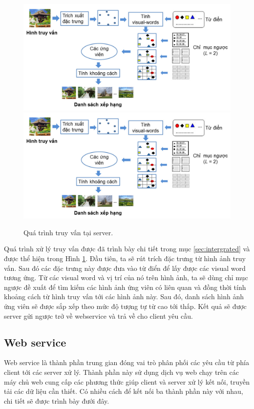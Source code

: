 \begin{figure}[!htbp]
  \begin{center}
    \leavevmode
    \ifpdf
      \includegraphics[scale=0.35]{query-process-server}
    \else
      \includegraphics[scale=0.35]{query-process-server}
    \fi
    \caption[Quá trình truy vấn tại server]{Quá trình truy vấn tại server.}
    \label{query-process-server}
  \end{center}
\end{figure}

Quá trình xử lý truy vấn được đã trình bày chi tiết trong mục \ref{sec:intergrated} và được thể hiện trong Hình \ref{query-process-server}. Đầu tiên, ta sẽ rút trích đặc trưng từ hình ảnh truy vấn. Sau đó các đặc trưng này được đưa vào từ điển để lấy được các visual word tương ứng. Từ các visual word và vị trí của nó trên hình ảnh, ta sẽ dùng chỉ mục ngược đề xuất để tìm kiếm các hình ảnh ứng viên có liên quan và đồng thời tính khoảng cách từ hình truy vấn tới các hình ảnh này. Sau đó, danh sách hình ảnh ứng viên sẽ được sắp xếp theo mức độ tượng tự từ cao tới thấp. Kết quả sẽ được server gửi ngược trở về webservice và trả về cho client yêu cầu.

\subsection{Web service}
\label{subsection:web_service}
Web service là thành phần trung gian đóng vai trò phân phối các yêu cầu từ phía client tới các server xử lý. Thành phần này sử dụng dịch vụ web chạy trên các máy chủ web cung cấp các phương thức giúp client và server xử lý kết nối, truyền tải các dữ liệu cần thiết. Có nhiều cách để kết nối ba thành phần này với nhau, chi tiết sẽ được trình bày đưới đây.

